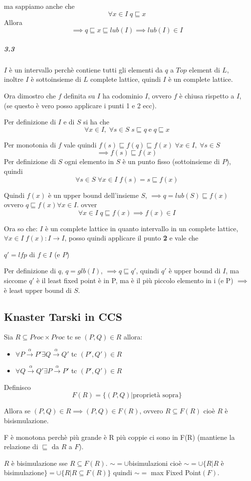 \documentclass{article}
\newcommand{\passo}{\xrightarrow{\alpha}}
\begin{document}
ma sappiamo anche che $$\forall x \in I \; q \sqsubseteq x$$ 
Allora
$$\implies q \sqsubseteq x \sqsubseteq lub(I) \implies lub(I) \in I$$

\subparagraph{3.3}

$I$ è un intervallo perchè contiene tutti gli elementi da $q$ a $Top $ element  di $L$, inoltre $I$ è sottoinsieme di $L$ complete lattice, quindi $I$ è un complete lattice.

Ora dimostro che $f$ definita su $I$ ha codominio $I$, ovvero $f$ è chiusa rispetto a $I$, (se questo è vero posso applicare i punti 1 e 2 ecc). 

Per definizione di $I$ e di $S$ si ha che $$ \forall x \in I, \; \forall s \in S \; s \sqsubseteq q\; \text{e}\; q \sqsubseteq x  $$

Per monotonia di $f$ vale quindi $f(s)\sqsubseteq f(q)\sqsubseteq f(x)\; \forall x \in I, \; \forall s \in S  $
$$\implies f(s) \sqsubseteq f(x)$$
Per definizione di $S$ ogni elemento in $S$ è un punto fisso (sottoinsieme di $P$), quindi $$\forall s \in S \; \forall x \in I \; f(s)=s\sqsubseteq f(x)$$

Quindi $f(x)$ è un upper bound dell'insieme $S$, $\implies q=lub(S) \sqsubseteq f(x) $ ovvero $q\sqsubseteq f(x) \forall x \in I$. ovver $$ \forall x \in I \; q \sqsubseteq f(x) \implies f(x) \in I$$

Ora so che: $I$ è un complete lattice in quanto intervallo in un complete lattice, $\forall x \in I \; f(x):I \to I$, posso quindi applicare il punto \textbf{2} e vale che 
\begin{center}
$q'=lfp$ di $f \in I$ (e $P$)
\end{center}

Per definizione di $q$, $q=glb(I)$, $\implies q \sqsubseteq q'$, quindi $q'$ è upper bound di $I$, ma siccome $q'$ è il least fixed point è in P, ma è il più piccolo elemento in i (e P) $\implies$ è least upper bound di $S$.

\subsection{Knaster Tarski in CCS}

Sia $R \subseteq Proc \times Proc$ tc se $(P, Q) \in R$ allora:
\begin{itemize}
    \item $\forall P \passo P' \exists Q \passo Q'$ tc $(P', Q') \in R$
    \item $\forall Q \passo Q' \exists P \passo P'$ tc $(P', Q') \in R$
\end{itemize}

Definisco $$F(R) = \{ (P,Q) | \text{proprietà sopra} \} $$

Allora se $(P,Q) \in R \implies (P,Q) \in F(R)$, ovvero $R \subseteq F(R)$ cioè $R$ è bisismulazione.

F è monotona perchè più grande è R più coppie ci sono in F(R) (mantiene la relazione di $\sqsubseteq$ da $R$ a $F$).

$R$ è bisimulazione sse $R \subseteq F(R)$. $ \sim= \cup$bisimulazioni cioè $\sim = \cup \{ R |R $ è bisimulazione$\} = \cup \{R | R \subseteq F(R)\} $ quindi $\sim = $ max Fixed Point$(F)$.
\end{document}
